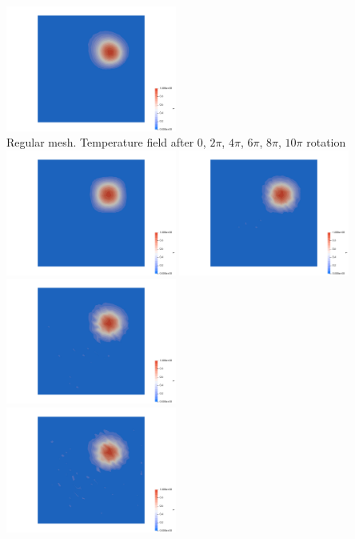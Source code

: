 \begin{center}
\includegraphics[width=5.6cm]{python_codes/fieldstone_45/results/reg0005}\\
{\captionfont Regular mesh. Temperature field after 0, $2\pi$, $4\pi$, $6\pi$, $8\pi$, $10\pi$ rotation}\\ 
\includegraphics[width=5.6cm]{python_codes/fieldstone_45/results/rand0000}
\includegraphics[width=5.6cm]{python_codes/fieldstone_45/results/rand0001}
\includegraphics[width=5.6cm]{python_codes/fieldstone_45/results/rand0002}\\
\includegraphics[width=5.6cm]{python_codes/fieldstone_45/results/rand0003}

\end{center}
